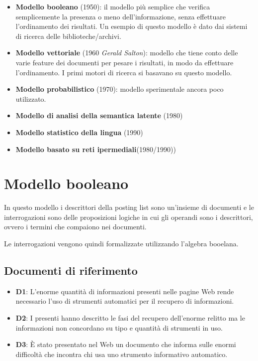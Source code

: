 \begin{itemize}
	\item \textbf{Modello booleano} (1950): il modello più semplice che verifica semplicemente la presenza o meno dell'informazione, senza effettuare l'ordinamento dei risultati. Un esempio di questo modello è dato dai sistemi di ricerca delle biblioteche/archivi.
	\item \textbf{Modello vettoriale} (1960 \textit{Gerald Salton}): modello che tiene conto delle varie feature dei documenti per pesare i risultati, in modo da effettuare l'ordinamento. I primi motori di ricerca si basavano su questo modello.
	\item \textbf{Modello probabilistico} (1970): modello sperimentale ancora poco utilizzato.
	\item \textbf{Modello di analisi della semantica latente} (1980)
	\item \textbf{Modello statistico della lingua} (1990)
	\item \textbf{Modello basato su reti ipermediali}(1980/1990))
\end{itemize}

\section{Modello booleano}


In questo modello i descrittori della posting list sono un'insieme di documenti e le interrogazioni sono delle proposizioni logiche in cui gli operandi sono i descrittori, ovvero i termini che compaiono nei documenti.

Le interrogazioni vengono quindi formalizzate utilizzando l'algebra booelana.

\subsection{Documenti di riferimento}

\begin{itemize}
	\item \textbf{D1}: L’enorme quantità di informazioni presenti nelle pagine Web rende necessario l’uso di strumenti automatici per il recupero di informazioni.
	\item \textbf{D2}: I presenti hanno descritto le fasi del recupero dell'enorme relitto ma le informazioni non concordano su tipo e quantità di strumenti in uso.
	\item \textbf{D3}: \`E stato presentato nel Web un documento che informa sulle enormi difficoltà che incontra chi usa uno strumento informativo automatico.
\end{itemize}

